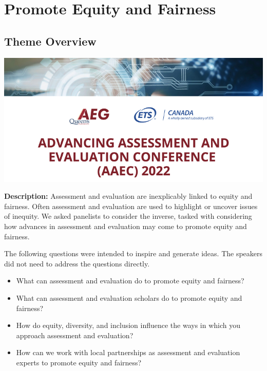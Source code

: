\documentclass[
]{book}
\begin{document}
\newpage

\hypertarget{theme3}{%
\chapter{Promote Equity and Fairness}\label{theme3}}

\hypertarget{theme-overview-2}{%
\section{Theme Overview}\label{theme-overview-2}}

\includegraphics{Content/H.png}

\textbf{Description:} Assessment and evaluation are inexplicably linked to equity and fairness. Often assessment and evaluation are used to highlight or uncover issues of inequity. We asked panelists to consider the inverse, tasked with considering how advances in assessment and evaluation may come to promote equity and fairness.

The following questions were intended to inspire and generate ideas. The speakers did not need to address the questions directly.

\begin{itemize}
\item
  What can assessment and evaluation do to promote equity and fairness?
\item
  What can assessment and evaluation scholars do to promote equity and fairness?
\item
  How do equity, diversity, and inclusion influence the ways in which you approach assessment and evaluation?
\item
  How can we work with local partnerships as assessment and evaluation experts to promote equity and fairness?
\end{itemize}

\newpage
\end{document}
